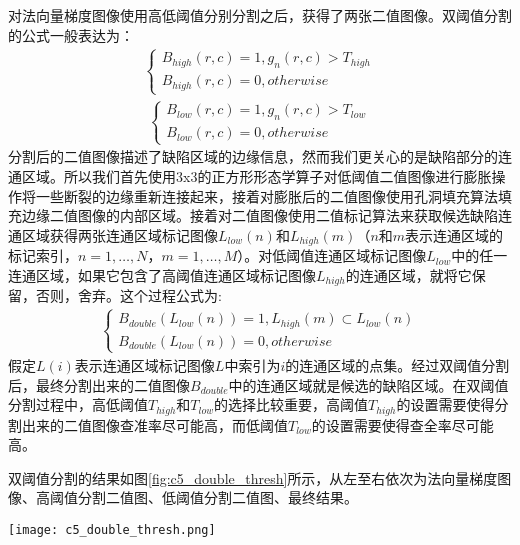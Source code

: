     对法向量梯度图像使用高低阈值分别分割之后，获得了两张二值图像。双阈值分割的公式一般表达为：
    \begin{eqnarray}
    \left\{ \begin{array}{l}
    {B_{high}}\left( {r,c} \right) = 1,{g_n}\left( {r,c} \right) > {T_{high}}\\
    {B_{high}}\left( {r,c} \right) = 0,otherwise
    \end{array} \right.
    \end{eqnarray}
    \begin{eqnarray}
    \left\{ \begin{array}{l}
    {B_{low}}\left( {r,c} \right) = 1,{g_n}\left( {r,c} \right) > {T_{low}}\\
    {B_{low}}\left( {r,c} \right) = 0,otherwise
    \end{array} \right.
    \end{eqnarray}
    分割后的二值图像描述了缺陷区域的边缘信息，然而我们更关心的是缺陷部分的连通区域。所以我们首先使用3x3的正方形形态学算子对低阈值二值图像进行膨胀操作将一些断裂的边缘重新连接起来，接着对膨胀后的二值图像使用孔洞填充算法填充边缘二值图像的内部区域。接着对二值图像使用二值标记算法来获取候选缺陷连通区域获得两张连通区域标记图像${L_{low}}\left( n \right)$和${L_{high}}\left( m \right)$（$n$和$m$表示连通区域的标记索引，$n = 1, \ldots ,N$，$m = 1, \ldots ,M$）。对低阈值连通区域标记图像$L_{low}$中的任一连通区域，如果它包含了高阈值连通区域标记图像$L_{high}$的连通区域，就将它保留，否则，舍弃。这个过程公式为:
    \begin{eqnarray}
    \left\{ \begin{array}{l}
    {B_{double}}\left( {{L_{low}}\left( n \right)} \right) = 1,{L_{high}}\left( m \right) \subset {L_{low}}\left( n \right)\\
    {B_{double}}\left( {{L_{low}}\left( n \right)} \right) = 0,otherwise
    \end{array} \right.
    \end{eqnarray}
    假定$L\left(i\right)$表示连通区域标记图像$L$中索引为$i$的连通区域的点集。经过双阈值分割后，最终分割出来的二值图像$B_{double}$中的连通区域就是候选的缺陷区域。在双阈值分割过程中，高低阈值$T_{high}$和$T_{low}$的选择比较重要，高阈值$T_{high}$的设置需要使得分割出来的二值图像查准率尽可能高，而低阈值$T_{low}$的设置需要使得查全率尽可能高。

    双阈值分割的结果如图\ref{fig:c5_double_thresh}所示，从左至右依次为法向量梯度图像、高阈值分割二值图、低阈值分割二值图、最终结果。

    \begin{figure*}[!h]
    \centering
    \texttt{[image: c5\_double\_thresh.png]}
    \caption{双阈值分割实验结果}
    \label{fig:c5_double_thresh}
    \end{figure*}

